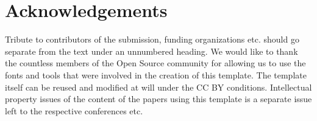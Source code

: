 \section*{Acknowledgements} %
Tribute to contributors of the submission, funding organizations etc. should go separate from the text under an unnumbered heading. We would like to thank the countless members of the Open Source community for allowing us to use the fonts and tools that were involved in the creation of this template. The template itself can be reused and modified at will under the CC BY conditions. Intellectual property issues of the content of the papers using this template is a separate issue left to the respective conferences etc. 

\printbibliography 

